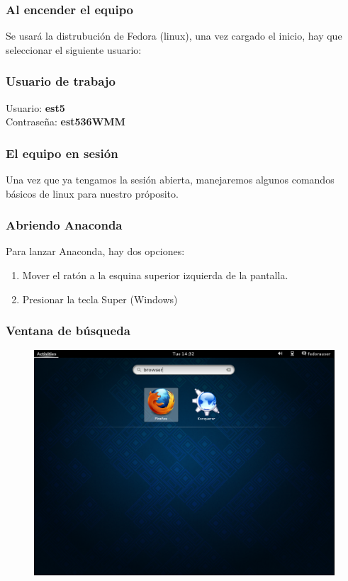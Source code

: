 \documentclass[12pt]{beamer}
\begin{document}
\begin{frame}
\frametitle{Al encender el equipo}
Se usará la distrubución de Fedora (linux), una vez cargado el inicio, hay que seleccionar el siguiente usuario:
\end{frame}
\begin{frame}
\frametitle{Usuario de trabajo}
Usuario: \textbf{est5}
\\
\bigskip
\pause
Contraseña: \textbf{est536WMM}
\end{frame}
\begin{frame}
\frametitle{El equipo en sesión}
Una vez que ya tengamos la sesión abierta, manejaremos algunos comandos básicos de linux para nuestro próposito.
\end{frame}
\begin{frame}
\frametitle{Abriendo Anaconda}
Para lanzar Anaconda, hay dos opciones:
\pause
{}
\begin{enumerate}[<+->]
\item Mover el ratón a la esquina superior izquierda de la pantalla.
\item Presionar la tecla Super (Windows)
\end{enumerate}
\end{frame}
\begin{frame}
\frametitle{Ventana de búsqueda}
\begin{figure}
    \centering
    \includegraphics[scale=0.3]{Imagenes/Fedora_01.png}
\end{figure}
\end{frame}
\end{document}
